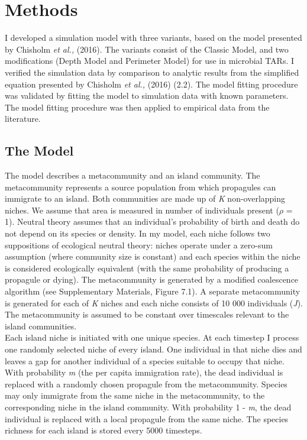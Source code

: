 \chapter{Methods}

I developed a simulation model with three variants, based on the model presented by Chisholm \textit{et al.,} (2016). The variants consist of the Classic Model, and two modifications (Depth Model and Perimeter Model) for use in microbial TARs. I verified the simulation data by comparison to analytic results from the simplified equation presented by Chisholm \textit{et al.,} (2016) (2.2). The model fitting procedure was validated by fitting the model to simulation data with known parameters. The model fitting procedure was then applied to empirical data from the literature.  

\section{The Model}
\noindent The model describes a metacommunity and an island community. The metacommunity represents a source population from which propagules can immigrate to an island. Both communities are made up of \textit{K} non-overlapping niches. We assume that area is measured in number of individuals present ($\rho$ = 1). Neutral theory assumes that an individual's probability of birth and death do not depend on its species or density. In my model, each niche follows two suppositions of ecological neutral theory: niches operate under a zero-sum assumption (where community size is constant) and each species within the niche is considered ecologically equivalent (with the same probability of producing a propagule or dying). The metacommunity is generated by a modified coalescence algorithm \cite{rosindell2008coalescence} (see Supplementary Materials, Figure 7.1). A separate metacommunity is generated for each of \textit{K} niches and each niche consists of 10 000 individuals (\textit{J}). The metacommunity is assumed to be constant over timescales relevant to the island communities.\\

\noindent Each island niche is initiated with one unique species. At each timestep I process one randomly selected niche of every island. One individual in that niche dies and leaves a gap for another individual of a species suitable to occupy that niche. With probability \textit{m} (the per capita immigration rate), the dead individual is replaced with a randomly chosen propagule from the metacommunity. Species may only immigrate from the same niche in the metacommunity, to the corresponding niche in the island community. With probability 1 - \textit{m}, the dead individual is replaced with a local propagule from the same niche. The species richness for each island is stored every 5000 timesteps.\\

